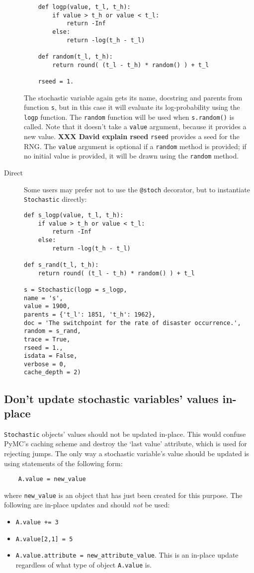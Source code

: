 \begin{description}
\begin{verbatim}
    def logp(value, t_l, t_h):
        if value > t_h or value < t_l:
            return -Inf
        else:
            return -log(t_h - t_l) 
            
    def random(t_l, t_h):
        return round( (t_l - t_h) * random() ) + t_l

    rseed = 1.
    \end{verbatim}
The stochastic variable again gets its name, docstring and parents from function \texttt{s}, but in this case it will evaluate its log-probability using the \texttt{logp} function. The \texttt{random} function will be used when \texttt{s.random()} is called. Note that it doesn't take a \texttt{value} argument, because it provides a new value. \textbf{XXX David explain rseed} \texttt{rseed} provides a seed for the RNG. The \texttt{value} argument is optional if a \texttt{random} method is provided; if no initial value is provided, it will be drawn using the \texttt{random} method.

    \item[Direct] Some users may prefer not to use the \texttt{@stoch} decorator, but to instantiate \texttt{Stochastic} directly:
\begin{verbatim}
def s_logp(value, t_l, t_h):
    if value > t_h or value < t_l:
        return -Inf
    else:
        return -log(t_h - t_l) 

def s_rand(t_l, t_h):
    return round( (t_l - t_h) * random() ) + t_l

s = Stochastic(logp = s_logp, 
name = 's', 
value = 1900,
parents = {'t_l': 1851, 't_h': 1962},
doc = 'The switchpoint for the rate of disaster occurrence.',
random = s_rand, 
trace = True, 
rseed = 1., 
isdata = False,
verbose = 0,
cache_depth = 2)
\end{verbatim}
\end{description}

\subsection{Don't update stochastic variables' values in-place}\label{sub:warning}

\texttt{Stochastic} objects' values should not be updated in-place. This would confuse PyMC's caching scheme and destroy the `last value' attribute, which is used for rejecting jumps. The only way a stochastic variable's value should be updated is using statements of the following form:
\begin{verbatim}
    A.value = new_value
\end{verbatim}
where \texttt{new\_value} is an object that has just been created for this purpose. The following are in-place updates and should \emph{not} be used:
\begin{itemize}
    \item \texttt{A.value += 3}
    \item \texttt{A.value[2,1] = 5}
    \item \texttt{A.value.attribute = new_attribute_value}. This is an in-place update regardless of what type of object \texttt{A.value} is.
\end{itemize}

